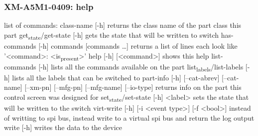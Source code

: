 \documentclass[11pt]{article}
\begin{document}
\subsubsection{XM-A5M1-0409: help}
\label{sec:org7d340a4}
list of commands:
  class-name [-h]
    returns the class name of the part class this part
  get\textsubscript{state}/get-state [-h]
    gets the state that will be written to switch
  has-commands [-h] commands [commands \ldots{}]
    returns a list of lines each look like '<command>: <is\textsubscript{present}>'
  help [-h] [<command>]
    shows this help
  list-commands [-h]
    lists all the commands available on the part
  list\textsubscript{labels}/list-labels [-h]
    lists all the labels that can be switched to
  part-info  [-h] [--cat-abrev] [--cat-name] [--xm-pn] [--mfg-pn] [--mfg-name]
          [--io-type]
    returns info on the part this control screen was designed for
  set\textsubscript{state}/set-state [-h] <label>
    sets the state that will be written to the switch
  virt-write [-h] [-i <event type>] [-f <bool>]
    instead of writting to spi bus, instead write to a virtual spi bus
    and return the log output
  write [-h]
    writes the data to the device
\end{document}

